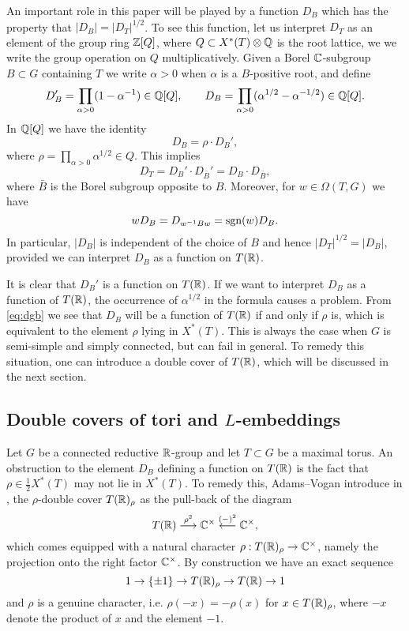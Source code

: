 \documentclass{article}
\theoremstyle{definition}
\numberwithin{equation}{section}
\renewcommand{\-}{\hyp{}}
\begin{document}
An important role in this paper will be played by a function $D_B$ which has the property that $|D_B|=|D_T|^{1/2}$. To see this function, let us interpret $D_T$ as an element of the group ring $\mathbb{Z}[Q]$, where $Q \subset X^*(T)\otimes\mathbb{Q}$ is the root lattice, we we write the group operation on $Q$ multiplicatively. Given a Borel $\mathbb{C}$-subgroup $B \subset G$ containing $T$ we write $\alpha>0$ when $\alpha$ is a $B$-positive root, and define
\begin{equation} \label{eq:weyldenom}
D_B' = \prod_{\alpha>0} (1-\alpha^{-1}) \in \mathbb{Q}[Q],\qquad D_B = \prod_{\alpha>0} (\alpha^{1/2}-\alpha^{-1/2}) \in \mathbb{Q}[Q].
\end{equation}
In $\mathbb{Q}[Q]$ we have the identity
\begin{equation} \label{eq:dgb}
D_B = \rho \cdot D_B',	
\end{equation}
where $\rho=\prod_{\alpha>0} \alpha^{1/2} \in Q$. This implies
\[ D_T = D_B' \cdot D_{\bar B}' = D_B \cdot D_{\bar B}, \]
where $\bar B$ is the Borel subgroup opposite to $B$. Moreover, for $w \in \Omega(T,G)$ we have
\begin{equation} \label{eq:wsd}
wD_B = D_{w^{-1}Bw} = \textrm{sgn}(w)D_B.	
\end{equation}
In particular, $|D_B|$ is independent of the choice of $B$ and hence $|D_T|^{1/2}=|D_B|$, provided we can interpret $D_B$ as a function on $T(\mathbb{R})$.

It is clear that $D_B'$ is a function on $T(\mathbb{R})$. If we want to interpret $D_B$ as a function of $T(\mathbb{R})$, the occurrence of $\alpha^{1/2}$ in the formula causes a problem. From \eqref{eq:dgb} we see that $D_B$ will be a function of $T(\mathbb{R})$ if and only if $\rho$ is, which is equivalent to the element $\rho$ lying in $X^*(T)$. This is always the case when $G$ is semi-simple and simply connected, but can fail in general. To remedy this situation, one can introduce a double cover of $T(\mathbb{R})$, which will be discussed in the next section.

\subsection{Double covers of tori and $L$\-embeddings} \label{sub:covtori}

Let $G$ be a connected reductive $\mathbb{R}$-group and let $T \subset G$ be a maximal torus. An obstruction to the element $D_B$ defining a function on $T(\mathbb{R})$ is the fact that $\rho \in \frac{1}{2}X^*(T)$ may not lie in $X^*(T)$. To remedy this, Adams--Vogan introduce in \cite{AV92}, \cite{AV16} the $\rho$-double cover $T(\mathbb{R})_\rho$ as the pull-back of the diagram
\[ T(\mathbb{R})\stackrel{\rho^2}{\longrightarrow} \mathbb{C}^\times \stackrel{(-)^2}{\longleftarrow} \mathbb{C}^\times, \]
which comes equipped with a natural character $\rho : T(\mathbb{R})_\rho \to \mathbb{C}^\times$, namely the projection onto the right factor $\mathbb{C}^\times$. By construction we have an exact sequence
\[ 1 \to \{\pm 1\} \to T(\mathbb{R})_\rho \to T(\mathbb{R}) \to 1 \]
and $\rho$ is a genuine character, i.e. $\rho(-x)=-\rho(x)$ for $x \in T(\mathbb{R})_\rho$, where $-x$ denote the product of $x$ and the element $-1$.
\end{document}
